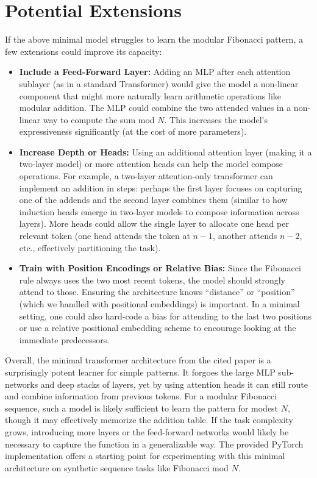 \documentclass{article}
\begin{document}
\section*{Potential Extensions}

If the above minimal model struggles to learn the modular Fibonacci pattern, a few extensions could improve its capacity:

\begin{itemize}
  \item \textbf{Include a Feed-Forward Layer:} Adding an MLP after each attention sublayer (as in a standard Transformer) would give the model a non-linear component that might more naturally learn arithmetic operations like modular addition. The MLP could combine the two attended values in a non-linear way to compute the sum mod $N$. This increases the model’s expressiveness significantly (at the cost of more parameters).
  \item \textbf{Increase Depth or Heads:} Using an additional attention layer (making it a two-layer model) or more attention heads can help the model compose operations. For example, a two-layer attention-only transformer can implement an addition in steps: perhaps the first layer focuses on capturing one of the addends and the second layer combines them (similar to how induction heads emerge in two-layer models to compose information across layers). More heads could allow the single layer to allocate one head per relevant token (one head attends the token at $n-1$, another attends $n-2$, etc., effectively partitioning the task).
  \item \textbf{Train with Position Encodings or Relative Bias:} Since the Fibonacci rule always uses the two most recent tokens, the model should strongly attend to those. Ensuring the architecture knows ``distance'' or ``position'' (which we handled with positional embeddings) is important. In a minimal setting, one could also hard-code a bias for attending to the last two positions or use a relative positional embedding scheme to encourage looking at the immediate predecessors.
\end{itemize}

Overall, the minimal transformer architecture from the cited paper is a surprisingly potent learner for simple patterns. It forgoes the large MLP sub-networks and deep stacks of layers, yet by using attention heads it can still route and combine information from previous tokens. For a modular Fibonacci sequence, such a model is likely sufficient to learn the pattern for modest $N$, though it may effectively memorize the addition table. If the task complexity grows, introducing more layers or the feed-forward networks would likely be necessary to capture the function in a generalizable way. The provided PyTorch implementation offers a starting point for experimenting with this minimal architecture on synthetic sequence tasks like Fibonacci mod $N$.
\end{document}
